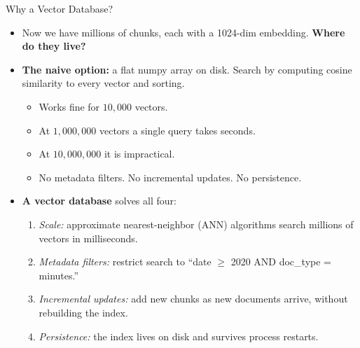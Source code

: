 \begin{frame}{Why a Vector Database?}
\begin{itemize}
\item Now we have millions of chunks, each with a 1024-dim embedding. \textbf{Where do they live?}

\medskip
\item \textbf{The naive option:} a flat numpy array on disk. Search by computing cosine similarity to every vector and sorting.
\begin{itemize}
    \item Works fine for $10{,}000$ vectors.
    \item At $1{,}000{,}000$ vectors a single query takes seconds.
    \item At $10{,}000{,}000$ it is impractical.
    \item No metadata filters. No incremental updates. No persistence.
\end{itemize}

\medskip
\item \textbf{A vector database} solves all four:
\begin{enumerate}
    \item \emph{Scale:} approximate nearest-neighbor (ANN) algorithms search millions of vectors in milliseconds.
    \item \emph{Metadata filters:} restrict search to ``date $\geq$ 2020 AND doc\_type = minutes.''
    \item \emph{Incremental updates:} add new chunks as new documents arrive, without rebuilding the index.
    \item \emph{Persistence:} the index lives on disk and survives process restarts.
\end{enumerate}
\end{itemize}
\end{frame}

